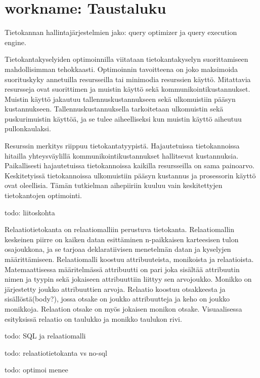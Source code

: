 \documentclass[finnish]{tktltiki2}
\theoremstyle{definition}
\theoremstyle{remark}
\begin{document}


\section{workname: Taustaluku}
Tietokannan hallintajärjestelmien jako: query optimizer ja query execution engine.

Tietokantakyselyiden optimoinnilla viitataan tietokantakyselyn suorittamiseen mahdollisimman tehokkaasti. Optimoinnin tavoitteena on joko maksimoida suorituskyky annetuilla resursseilla tai minimodia resurssien käyttö. Mitattavia resursseja ovat suorittimen ja muistin käyttö sekä kommunikointikustannukset. Muistin käyttö jakautuu tallennuskustannukseen sekä ulkomuistiin pääsyn kustannukseen. Tallennuskustannuksella tarkoitetaan ulkomuistin sekä puskurimuistin käyttöä, ja se tulee aiheelliseksi kun muistin käyttö aiheutuu pullonkaulaksi. 

Resurssin merkitys riippuu tietokantatyypistä. Hajautetuissa tietokannoissa hitailla yhteysväylillä kommunikointikustannukset hallitsevat kustannuksia. Paikallisesti hajautetuissa tietokannoissa kaikilla resursseilla on sama painoarvo. Keskitetyissä tietokannoissa ulkomuistiin pääsyn kustannus ja prosessorin käyttö ovat oleellisia. Tämän tutkielman aihepiiriin kuuluu vain keskitettyjen tietokantojen optimointi.

todo: liitoskohta

Relaatiotietokanta on relaatiomalliin perustuva tietokanta. Relaatiomallin keskeinen piirre on kaiken datan esittäminen n-paikkaisen karteesisen tulon osajoukkona, ja se tarjoaa deklaratiivisen menetelmän datan ja kyselyjen määrittämiseen. Relaatiomalli koostuu attribuuteista, monikoista ja relaatioista. Matemaattisessa määritelmässä attribuutti on pari joka sisältää attribuutin nimen ja tyypin sekä jokaiseen attribuuttiin liittyy sen arvojoukko. Monikko on järjestetty joukko attribuuttien arvoja. Relaatio koostuu otsakkeesta ja sisällöstä(body?), jossa otsake on joukko attribuutteja ja keho on joukko monikkoja. Relaation otsake on myös jokaisen monikon otsake. Visuaalisessa esityksissä relaatio on taulukko ja monikko taulukon rivi. 

todo: SQL ja relaatiomalli

todo: relaatiotietokanta vs no-sql

todo: optimoi menee
\end{document}
